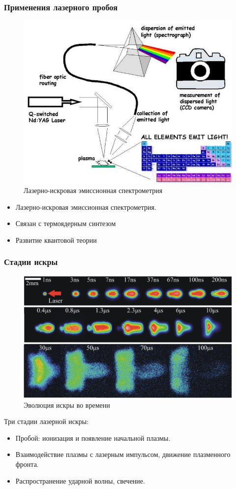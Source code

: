 \documentclass{beamer}
\begin{document}
	\begin{frame}
		\frametitle{Применения лазерного пробоя}
	
		\begin{figure}
			\centering
			\includegraphics[width=0.5\linewidth]{res/libs.jpg}
			\caption*{Лазерно-искровая эмиссионная спектрометрия}
		\end{figure}
			
		\begin{itemize}
			\item Лазерно-искровая эмиссионная спектрометрия.
			\item Связан с термоядерным синтезом
			\item Развитие квантовой теории
		\end{itemize}

%		
%		
	\end{frame}
	
	\begin{frame}
		\frametitle{Стадии искры}
		\begin{figure}
			\centering
			\includegraphics[width=0.8\linewidth]{res/spark_evolution.png}
			\caption*{Эволюция искры во времени}
		\end{figure}
		\vspace{-5pt}
		Три стадии лазерной искры:
		\begin{itemize}
			\item Пробой: ионизация и появление начальной плазмы.
			\item Взаимодействие плазмы с лазерным импульсом, движение плазменного фронта.
			\item Распространение ударной волны, свечение.
		\end{itemize}
	\end{frame}
	
\end{document}
